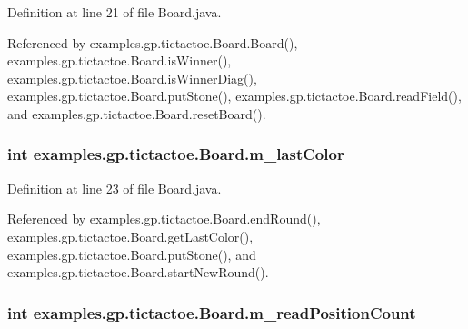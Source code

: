 Definition at line 21 of file Board.\-java.



Referenced by examples.\-gp.\-tictactoe.\-Board.\-Board(), examples.\-gp.\-tictactoe.\-Board.\-is\-Winner(), examples.\-gp.\-tictactoe.\-Board.\-is\-Winner\-Diag(), examples.\-gp.\-tictactoe.\-Board.\-put\-Stone(), examples.\-gp.\-tictactoe.\-Board.\-read\-Field(), and examples.\-gp.\-tictactoe.\-Board.\-reset\-Board().

\hypertarget{classexamples_1_1gp_1_1tictactoe_1_1_board_acd48df1a754036bd19d55f17239b4e05}{
\subsubsection[{m\-\_\-last\-Color}]{\setlength{\rightskip}{0pt plus 5cm}int examples.\-gp.\-tictactoe.\-Board.\-m\-\_\-last\-Color\hspace{0.3cm}{\ttfamily [private]}}}\label{classexamples_1_1gp_1_1tictactoe_1_1_board_acd48df1a754036bd19d55f17239b4e05}


Definition at line 23 of file Board.\-java.



Referenced by examples.\-gp.\-tictactoe.\-Board.\-end\-Round(), examples.\-gp.\-tictactoe.\-Board.\-get\-Last\-Color(), examples.\-gp.\-tictactoe.\-Board.\-put\-Stone(), and examples.\-gp.\-tictactoe.\-Board.\-start\-New\-Round().

\hypertarget{classexamples_1_1gp_1_1tictactoe_1_1_board_a82ff9c8f75d493909e1bd0e06d261a21}{
\subsubsection[{m\-\_\-read\-Position\-Count}]{\setlength{\rightskip}{0pt plus 5cm}int examples.\-gp.\-tictactoe.\-Board.\-m\-\_\-read\-Position\-Count\hspace{0.3cm}{\ttfamily [private]}}}\label{classexamples_1_1gp_1_1tictactoe_1_1_board_a82ff9c8f75d493909e1bd0e06d261a21}


